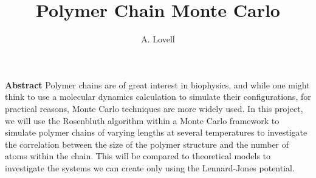 \documentclass{article}
\begin{document}
\title{Polymer Chain Monte Carlo}
\author{A. Lovell}
\maketitle

\noindent \textbf{Abstract}  Polymer chains are of great interest in biophysics, and while one might think to use a molecular dynamics calculation to simulate their configurations, for practical reasons, Monte Carlo techniques are more widely used.  In this project, we will use the Rosenbluth algorithm within a Monte Carlo framework to simulate polymer chains of varying lengths at several temperatures to investigate the correlation between the size of the polymer structure and the number of atoms within the chain.  This will be compared to theoretical models to investigate the systems we can create only using the Lennard-Jones potential.
\end{document}
